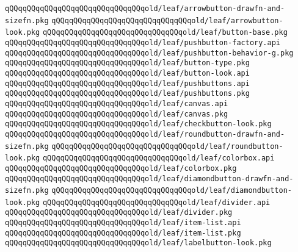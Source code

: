 \newline
\verb|qQQqqQQqqQQqqQQqqQQqqQQqqQQqqQQqold/leaf/arrowbutton-drawfn-and-sizefn.pkg|\newline
\verb|qQQqqQQqqQQqqQQqqQQqqQQqqQQqqQQqold/leaf/arrowbutton-look.pkg|\newline
\verb|qQQqqQQqqQQqqQQqqQQqqQQqqQQqqQQqold/leaf/button-base.pkg|\newline
\verb|qQQqqQQqqQQqqQQqqQQqqQQqqQQqqQQqold/leaf/pushbutton-factory.api|\newline
\verb|qQQqqQQqqQQqqQQqqQQqqQQqqQQqqQQqold/leaf/pushbutton-behavior-g.pkg|\newline
\verb|qQQqqQQqqQQqqQQqqQQqqQQqqQQqqQQqold/leaf/button-type.pkg|\newline
\verb|qQQqqQQqqQQqqQQqqQQqqQQqqQQqqQQqold/leaf/button-look.api|\newline
\verb|qQQqqQQqqQQqqQQqqQQqqQQqqQQqqQQqold/leaf/pushbuttons.api|\newline
\verb|qQQqqQQqqQQqqQQqqQQqqQQqqQQqqQQqold/leaf/pushbuttons.pkg|\newline
\verb|qQQqqQQqqQQqqQQqqQQqqQQqqQQqqQQqold/leaf/canvas.api|\newline
\verb|qQQqqQQqqQQqqQQqqQQqqQQqqQQqqQQqold/leaf/canvas.pkg|\newline
\verb|qQQqqQQqqQQqqQQqqQQqqQQqqQQqqQQqold/leaf/checkbutton-look.pkg|\newline
\verb|qQQqqQQqqQQqqQQqqQQqqQQqqQQqqQQqold/leaf/roundbutton-drawfn-and-sizefn.pkg|\newline
\verb|qQQqqQQqqQQqqQQqqQQqqQQqqQQqqQQqold/leaf/roundbutton-look.pkg|\newline
\verb|qQQqqQQqqQQqqQQqqQQqqQQqqQQqqQQqold/leaf/colorbox.api|\newline
\verb|qQQqqQQqqQQqqQQqqQQqqQQqqQQqqQQqold/leaf/colorbox.pkg|\newline
\verb|qQQqqQQqqQQqqQQqqQQqqQQqqQQqqQQqold/leaf/diamondbutton-drawfn-and-sizefn.pkg|\newline
\verb|qQQqqQQqqQQqqQQqqQQqqQQqqQQqqQQqold/leaf/diamondbutton-look.pkg|\newline
\verb|qQQqqQQqqQQqqQQqqQQqqQQqqQQqqQQqold/leaf/divider.api|\newline
\verb|qQQqqQQqqQQqqQQqqQQqqQQqqQQqqQQqold/leaf/divider.pkg|\newline
\verb|qQQqqQQqqQQqqQQqqQQqqQQqqQQqqQQqold/leaf/item-list.api|\newline
\verb|qQQqqQQqqQQqqQQqqQQqqQQqqQQqqQQqold/leaf/item-list.pkg|\newline
\verb|qQQqqQQqqQQqqQQqqQQqqQQqqQQqqQQqold/leaf/labelbutton-look.pkg|\newline
